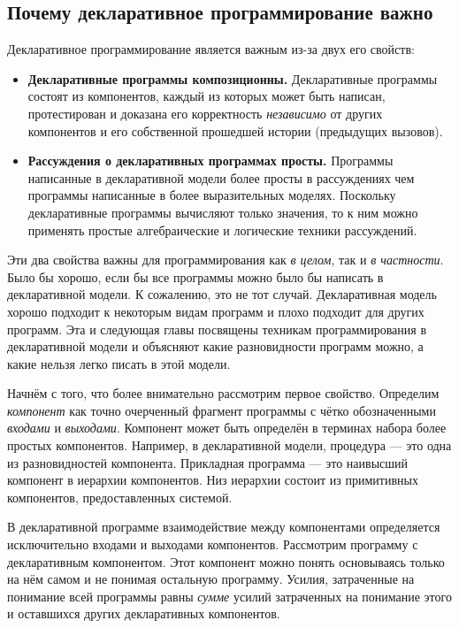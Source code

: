 \subsection*{Почему декларативное программирование важно}

Декларативное программирование является важным из-за двух его свойств:

\begin{itemize}
\item{\textbf{Декларативные программы композиционны.} Декларативные программы состоят из компонентов, каждый из которых может быть написан, протестирован и доказана его корректность \emph{независимо} от других компонентов и его собственной прошедшей истории (предыдущих вызовов).}

\item{\textbf{Рассуждения о декларативных программах просты.} Программы написанные в декларативной модели более просты в рассуждениях чем программы написанные в более выразительных моделях. Поскольку декларативные программы вычисляют только значения, то к ним можно применять простые алгебраические и логические техники рассуждений.}
\end{itemize}

Эти два свойства важны для программирования как \emph{в целом}, так и \emph{в частности}. Было бы хорошо, если бы все программы можно было бы написать в декларативной модели. К сожалению, это не тот случай. Декларативная модель хорошо подходит к некоторым видам программ и плохо подходит для других программ. Эта и следующая главы посвящены техникам программирования в декларативной модели и объясняют какие разновидности программ можно, а какие нельзя легко писать в этой модели.

Начнём с того, что более внимательно рассмотрим первое свойство. Определим \emph{компонент} как точно очерченный фрагмент программы с чётко обозначенными \emph{входами} и \emph{выходами}. Компонент может быть определён в терминах набора более простых компонентов. Например, в декларативной модели, процедура --- это одна из разновидностей компонента. Прикладная программа --- это наивысший компонент в иерархии компонентов. Низ иерархии состоит из примитивных компонентов, предоставленных системой.

В декларативной программе взаимодействие между компонентами определяется исключительно входами и выходами компонентов. Рассмотрим программу с декларативным компонентом. Этот компонент можно понять основываясь только на нём самом и не понимая остальную программу. Усилия, затраченные на понимание всей программы равны \emph{сумме} усилий затраченных на понимание этого и оставшихся других декларативных компонентов.



